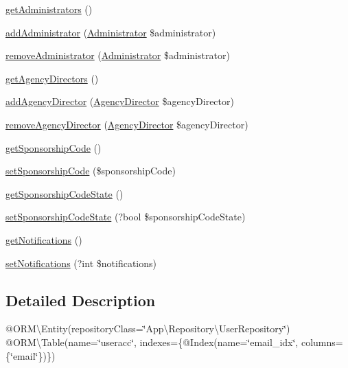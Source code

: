 \begin{DoxyCompactItemize}
\item 
\mbox{\hyperlink{class_app_1_1_entity_1_1_user_ae328d7d5e793edba2c422b1be2e729a9}{get\+Administrators}} ()
\item 
\mbox{\hyperlink{class_app_1_1_entity_1_1_user_addad08591dc28219455a908890821b87}{add\+Administrator}} (\mbox{\hyperlink{class_app_1_1_entity_1_1_administrator}{Administrator}} \$administrator)
\item 
\mbox{\hyperlink{class_app_1_1_entity_1_1_user_a38cf45790a7494be42e7db4797d8eff0}{remove\+Administrator}} (\mbox{\hyperlink{class_app_1_1_entity_1_1_administrator}{Administrator}} \$administrator)
\item 
\mbox{\hyperlink{class_app_1_1_entity_1_1_user_ae78734b06690a61802438c55bb0850ef}{get\+Agency\+Directors}} ()
\item 
\mbox{\hyperlink{class_app_1_1_entity_1_1_user_ab1bd9da22af2775fc86ee59c38674271}{add\+Agency\+Director}} (\mbox{\hyperlink{class_app_1_1_entity_1_1_agency_director}{Agency\+Director}} \$agency\+Director)
\item 
\mbox{\hyperlink{class_app_1_1_entity_1_1_user_a3ddb9416b806067ad6d24d846a412b74}{remove\+Agency\+Director}} (\mbox{\hyperlink{class_app_1_1_entity_1_1_agency_director}{Agency\+Director}} \$agency\+Director)
\item 
\mbox{\hyperlink{class_app_1_1_entity_1_1_user_ac33851e878a0d81b8bd13b058c854224}{get\+Sponsorship\+Code}} ()
\item 
\mbox{\hyperlink{class_app_1_1_entity_1_1_user_a3b5111e3ac63bc4e9907ee56dd47703e}{set\+Sponsorship\+Code}} (\$sponsorship\+Code)
\item 
\mbox{\hyperlink{class_app_1_1_entity_1_1_user_a6eaf2212f9e9e409fab30ffa0b57e3aa}{get\+Sponsorship\+Code\+State}} ()
\item 
\mbox{\hyperlink{class_app_1_1_entity_1_1_user_a708280d4252b9b6b6a574a393c69b865}{set\+Sponsorship\+Code\+State}} (?bool \$sponsorship\+Code\+State)
\item 
\mbox{\hyperlink{class_app_1_1_entity_1_1_user_a0548a0b0874d7857558b0b0583bc6159}{get\+Notifications}} ()
\item 
\mbox{\hyperlink{class_app_1_1_entity_1_1_user_a97c0a2bfd5421dcbedfd32cfe4145217}{set\+Notifications}} (?int \$notifications)
\end{DoxyCompactItemize}


\subsection{Detailed Description}
@\+O\+RM\textbackslash{}\+Entity(repository\+Class=\char`\"{}\+App\textbackslash{}\+Repository\textbackslash{}\+User\+Repository\char`\"{}) @\+O\+RM\textbackslash{}\+Table(name=\char`\"{}useracc\char`\"{}, indexes=\{@\+Index(name=\char`\"{}email\+\_\+idx\char`\"{}, columns=\{\char`\"{}email\char`\"{}\})\}) 


